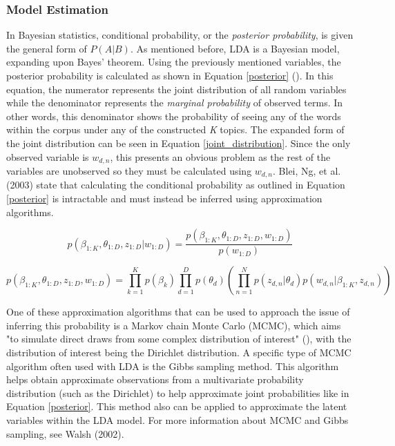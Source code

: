 \documentclass[a4paper, 12pt, twoside]{article}
\numberwithin{equation}{section} %
\begin{document}
\subsubsection{Model Estimation}

In Bayesian statistics, conditional probability, or the \textit{posterior probability}, is given the general form of $P(A|B)$. As mentioned before, LDA is a Bayesian model, expanding upon Bayes' theorem. Using the previously mentioned variables, the posterior probability is calculated as shown in Equation \ref{posterior} (\cite{blei2012}). In this equation, the numerator represents the joint distribution of all random variables while the denominator represents the \textit{marginal probability} of observed terms. In other words, this denominator shows the probability of seeing any of the words within the corpus under any of the constructed \textit{K} topics. The expanded form of the joint distribution can be seen in Equation \ref{joint_distribution}. Since the only observed variable is $w_{d,n}$, this presents an obvious problem as the rest of the variables are unobserved so they must be calculated using $w_{d,n}$. Blei, Ng, et al. (2003) state that calculating the conditional probability as outlined in Equation \ref{posterior} is intractable and must instead be inferred using approximation algorithms. 

\begin{equation} \label{posterior}
p(\beta_{1:K}, \theta_{1:D}, z_{1:D} | w_{1:D}) = \frac{p(\beta_{1:K}, \theta_{1:D}, z_{1:D}, w_{1:D})}{p(w_{1:D})}
\end{equation}

\begin{equation} \label{joint_distribution}
p(\beta_{1:K}, \theta_{1:D}, z_{1:D}, w_{1:D})=\prod\limits_{k=1}^{K} p(\beta_k)\prod\limits_{d=1}^{D} p(\theta_d)\left(\prod\limits_{n=1}^{N}p(z_{d,n}|\theta_d)p(w_{d,n}|\beta_{1:K},z_{d,n})\right)
\end{equation}


One of these approximation algorithms that can be used to approach the issue of inferring this probability is a Markov chain Monte Carlo (MCMC), which aims "to simulate direct draws from some complex distribution of interest" (\cite{walsh2002}), with the distribution of interest being the Dirichlet distribution. A specific type of MCMC algorithm often used with LDA is the Gibbs sampling method. This algorithm helps obtain approximate observations from a multivariate probability distribution (such as the Dirichlet) to help approximate joint probabilities like in Equation \ref{posterior}. This method also can be applied to approximate the latent variables within the LDA model. For more information about MCMC and Gibbs sampling, see Walsh (2002). 
\end{document}
